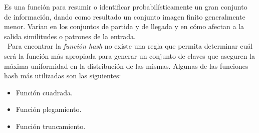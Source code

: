 \documentclass[letterpaper,openright,12pt]{report}
\begin{document}
Es una función para resumir o identificar probabilísticamente un gran
conjunto de información, dando como resultado un conjunto imagen finito
generalmente menor. Varían en los conjuntos de partida y de llegada y en
cómo afectan a la salida similitudes o patrones de la entrada.\\\
{Para encontrar la \emph{función hash} no existe una regla que permita
determinar cuál será la función más apropiada para generar un conjunto
de claves que aseguren la máxima uniformidad en la distribución de las
mismas. Algunas de las funciones hash más utilizadas son las
siguientes:}
\begin{itemize}
\itemsep1pt\parskip0pt
\item
  Función cuadrada.
\item
  Función plegamiento.
\item
  Función truncamiento.
\end{itemize}
\end{document}
